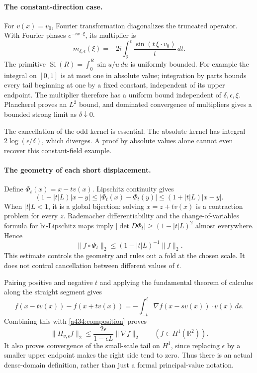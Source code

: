 \documentclass[11pt]{article}
\begin{document}
\paragraph{The constant-direction case.}
For $v(x)=v_0$, Fourier transformation diagonalizes the truncated
operator. With Fourier phases $e^{-ix\cdot\xi}$, its multiplier is
\[
 m_{\delta,\epsilon}(\xi)
 =-2i\int_\delta^\epsilon
                    \frac{\sin(t\,\xi\cdot v_0)}t\,dt.
\]
The primitive $\operatorname{Si}(R)=\int_0^R\sin u/u\,du$ is
uniformly bounded. For example the integral on $[0,1]$ is at
most one in absolute value; integration by parts bounds every
tail beginning at one by a fixed constant, independent of its
upper endpoint. The multiplier therefore has a uniform bound
independent of $\delta,\epsilon,\xi$. Plancherel proves an
$L^2$ bound, and dominated convergence of multipliers gives
a bounded strong limit as $\delta\downarrow0$.

The cancellation of the odd kernel is essential. The absolute
kernel has integral $2\log(\epsilon/\delta)$, which diverges.
A proof by absolute values alone cannot even recover this
constant-field example.

\paragraph{The geometry of each short displacement.}
Define $\Phi_t(x)=x-tv(x)$. Lipschitz continuity gives
\[
 (1-|t|L)|x-y|\leq|\Phi_t(x)-\Phi_t(y)|
                         \leq(1+|t|L)|x-y|.
\]
When $|t|L<1$, it is a global bijection: solving
$x=z+tv(x)$ is a contraction problem for every $z$.
Rademacher differentiability and the change-of-variables
formula for bi-Lipschitz maps imply
$|\det D\Phi_t|\geq(1-|t|L)^2$ almost everywhere. Hence
\begin{equation}\label{a434:composition}
 \|f\circ\Phi_t\|_2\leq(1-|t|L)^{-1}\|f\|_2.
\end{equation}
This estimate controls the geometry and rules out a fold
at the chosen scale. It does not control cancellation
between different values of $t$.

Pairing positive and negative $t$ and applying the fundamental
theorem of calculus along the straight segment gives
\[
 f(x-tv(x))-f(x+tv(x))
 =-\int_{-t}^t\nabla f(x-sv(x))\cdot v(x)\,ds.
\]
Combining this with \eqref{a434:composition} proves
\begin{equation}\label{a434:h1}
 \|H_{v,\epsilon}f\|_2
 \leq\frac{2\epsilon}{1-\epsilon L}\|\nabla f\|_2
 \qquad(f\in H^1(\mathbb R^2)).
\end{equation}
It also proves convergence of the small-scale tail on $H^1$,
since replacing $\epsilon$ by a smaller upper endpoint
makes the right side tend to zero. Thus there is an actual
dense-domain definition, rather than just a formal
principal-value notation.
\end{document}
